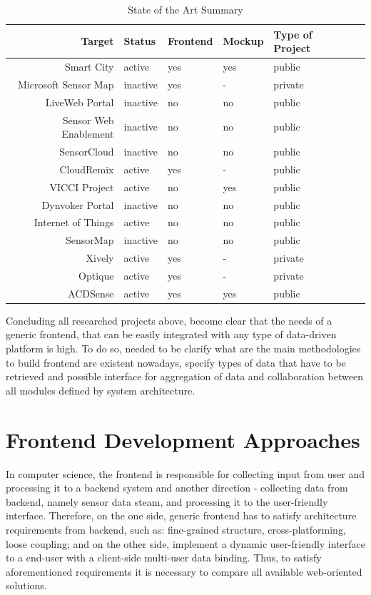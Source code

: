     \begin{table}[H]
	\centering
	\begin{tabular}{|r|l|l|l|l|l|}
	\hline
	Target 			       & Status & Frontend & Mockup & Type of Project \\
	\hline 
	\hline
	Smart City		       & active & yes & yes & public \\
	\hline
	Microsoft Sensor Map   & inactive & yes & - & private \\
	\hline
	LiveWeb Portal	       & inactive & no & no & public \\
	\hline
	Sensor Web Enablement  & inactive & no & no & public \\
	\hline
	SensorCloud		       & inactive & no & no & public \\
	\hline
	CloudRemix		       & active & yes & - & public \\
	\hline
	VICCI Project		   & active & no & yes & public \\
	\hline
	Dynvoker Portal		   & inactive & no & no & public \\
	\hline
	Internet of Things	   & active & no & no & public \\
	\hline
	SensorMap              & inactive & no & no & public \\
	\hline
	Xively                 & active & yes & - & private \\
	\hline
	Optique                & active & yes & - & private \\
	\hline
	ACDSense               & active & yes & yes & public \\
	\hline
	\end{tabular}
	\caption[State of the Art]{State of the Art Summary}
	\label{tab:state_of_the_art}
	\end{table}

    Concluding all researched projects above, become clear that the needs of a generic frontend, that can be easily integrated with any type of data-driven platform is high. To do so, needed to be clarify what are the main methodologies to build frontend are existent nowadays, specify types of data that have to be retrieved and possible interface for aggregation of data and collaboration between all modules defined by system architecture.

\section{Frontend Development Approaches}
In computer science, the frontend is responsible for collecting input from user and processing it to a backend system and another direction - collecting data from backend, namely sensor data steam, and processing it to the user-friendly interface. Therefore, on the one side, generic frontend has to satisfy architecture requirements from backend, such as: fine-grained structure, cross-platforming, loose coupling; and on the other side, implement a dynamic user-friendly interface to a end-user with a client-side multi-user data binding. Thus, to satisfy aforementioned requirements it is necessary to compare all available web-oriented solutions.

